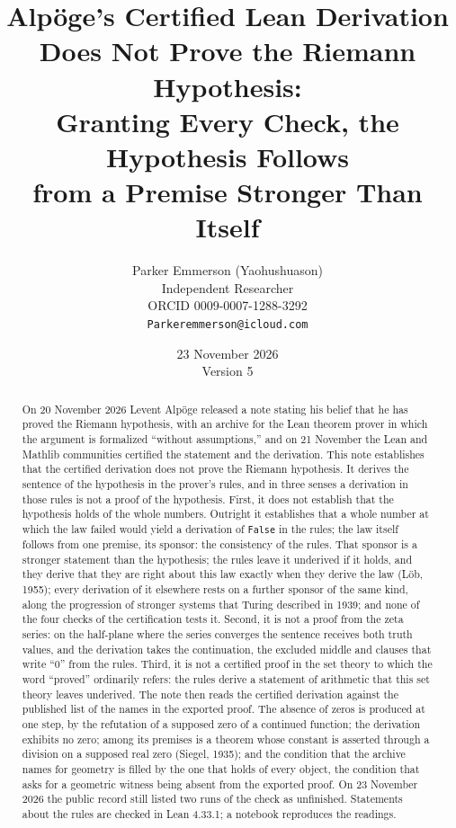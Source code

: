 \documentclass[11pt]{article}
\title{Alp\"oge's Certified Lean Derivation\\ Does Not Prove the Riemann Hypothesis:\\[4pt] \large Granting Every Check, the Hypothesis Follows\\ from a Premise Stronger Than Itself}
\author{Parker Emmerson (Yaohushuason)\\[2pt]
\small Independent Researcher\\
\small ORCID 0009-0007-1288-3292\\
\small \texttt{Parkeremmerson@icloud.com}}
\date{23 November 2026\\[2pt]\small Version 5}
\theoremstyle{definition}
\theoremstyle{remark}
\DeclareRobustCommand{\lean}[1]{{\renewcommand{\_}{\textunderscore\allowbreak}\texttt{#1}}}
\newcommand{\False}{\lean{False}}
\begin{document}
\maketitle


\begin{abstract}
On 20 November 2026 Levent Alp\"oge released a note stating his belief that he has proved the Riemann hypothesis, with an archive for the Lean theorem prover in which the argument is formalized ``without assumptions,'' and on 21 November the Lean and Mathlib communities certified the statement and the derivation. This note establishes that the certified derivation does not prove the Riemann hypothesis. It derives the sentence of the hypothesis in the prover's rules, and in three senses a derivation in those rules is not a proof of the hypothesis. First, it does not establish that the hypothesis holds of the whole numbers. Outright it establishes that a whole number at which the law failed would yield a derivation of \False{} in the rules; the law itself follows from one premise, its sponsor: the consistency of the rules. That sponsor is a stronger statement than the hypothesis; the rules leave it underived if it holds, and they derive that they are right about this law exactly when they derive the law (L\"ob, 1955); every derivation of it elsewhere rests on a further sponsor of the same kind, along the progression of stronger systems that Turing described in 1939; and none of the four checks of the certification tests it. Second, it is not a proof from the zeta series: on the half-plane where the series converges the sentence receives both truth values, and the derivation takes the continuation, the excluded middle and clauses that write ``0'' from the rules. Third, it is not a certified proof in the set theory to which the word ``proved'' ordinarily refers: the rules derive a statement of arithmetic that this set theory leaves underived. The note then reads the certified derivation against the published list of the names in the exported proof. The absence of zeros is produced at one step, by the refutation of a supposed zero of a continued function; the derivation exhibits no zero; among its premises is a theorem whose constant is asserted through a division on a supposed real zero (Siegel, 1935); and the condition that the archive names for geometry is filled by the one that holds of every object, the condition that asks for a geometric witness being absent from the exported proof. On 23 November 2026 the public record still listed two runs of the check as unfinished. Statements about the rules are checked in Lean 4.33.1; a notebook reproduces the readings.
\end{abstract}
\end{document}

